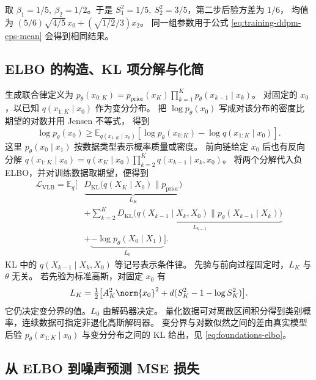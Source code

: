 \begin{example}[两步条件后验]
取 \(\beta_1=1/5,\ \beta_2=1/2\)。于是
\(S_1^2=1/5,\ S_2^2=3/5\)，第二步后验方差为 \(1/6\)，
均值为 \((5/6)\sqrt{4/5}\,x_0+(\sqrt{1/2}/3)x_2\)。
同一组参数用于公式 \eqref{eq:training-ddpm-eps-mean} 会得到相同结果。
\end{example}

\subsection{ELBO 的构造、KL 项分解与化简\requiredderivation}
\label{subsec:training-ddpm-elbo}

生成联合律定义为 \(p_\theta(x_{0:K})=p_{\mathrm{prior}}(x_K)
\prod_{k=1}^Kp_\theta(x_{k-1}\mid x_k)\)。
对固定的 \(x_0\)，以已知 \(q(x_{1:K}\mid x_0)\) 作为变分分布。
把 \(\log p_\theta(x_0)\) 写成对该分布的密度比期望的对数并用 Jensen 不等式，
得到
\[
  \log p_\theta(x_0)\ge
  \mathbb E_{q(x_{1:K}\mid x_0)}
  \left[\log p_\theta(x_{0:K})-\log q(x_{1:K}\mid x_0)\right].
\]
这里 \(p_\theta(x_0\mid x_1)\) 按数据类型表示概率质量或密度。
前向链给定 \(x_0\) 后也有反向分解
\(q(x_{1:K}\mid x_0)=q(x_K\mid x_0)
\prod_{k=2}^K q(x_{k-1}\mid x_k,x_0)\)。
将两个分解代入负 ELBO，并对训练数据取期望，便得到
\begin{equation}
  \begin{aligned}
  \mathcal L_{\mathrm{VLB}}
  =\mathbb E_q\bigg[
  &\underbrace{D_{\mathrm{KL}}\big(q(X_K\mid X_0)\|
                                      p_{\mathrm{prior}}\big)}_{L_K}\\
  &+\sum_{k=2}^K\underbrace{D_{\mathrm{KL}}\big(q(X_{k-1}\mid X_k,X_0)
                                  \|p_\theta(X_{k-1}\mid X_k)\big)}_{L_{k-1}}\\
  &+\underbrace{-\log p_\theta(X_0\mid X_1)}_{L_0}\bigg].
  \end{aligned}
  \label{eq:training-ddpm-elbo}
\end{equation}
KL 中的 \(q(X_{k-1}\mid X_k,X_0)\) 等记号表示条件律。
先验与前向过程固定时，\(L_K\) 与 \(\theta\) 无关。
若先验为标准高斯，对固定 \(x_0\) 有
\[
  L_K=\tfrac12\big[A_K^2\norm{x_0}^2
             +d(S_K^2-1-\log S_K^2)\big].
\]
它仍决定变分界的值。\(L_0\) 由解码器决定。
量化数据可对离散区间积分得到类别概率，连续数据可指定非退化高斯解码器。
变分界与对数似然之间的差由真实模型后验
\(p_\theta(x_{1:K}\mid x_0)\) 与变分分布之间的 KL 给出，见
\eqref{eq:foundations-elbo}。

\subsection{从 ELBO 到噪声预测 MSE 损失\requiredderivation}
\label{subsec:training-ddpm-mse}

